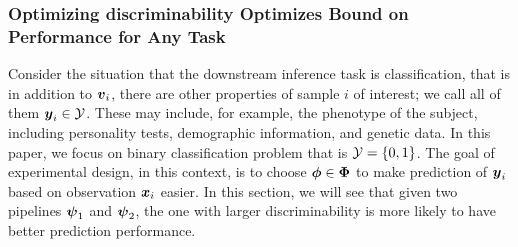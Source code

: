 \documentclass{article}
\begin{document}
\subsubsection{Optimizing discriminability Optimizes Bound on Performance for Any Task}

Consider the situation that the downstream inference task is classification, that is in addition to $\boldsymbol{v}_i$, there are other properties of sample $i$ of interest; we call all of them $\boldsymbol{y}_i \in \mathcal{Y}$.  These may include, for example, the phenotype of the subject, including personality tests, demographic information, and genetic data. In this paper, we focus on binary classification problem that is $\mathcal{Y}=\{0,1\}$. The goal of experimental design, in this context, is to choose $\boldsymbol{\phi} \in \boldsymbol{\Phi}$ to make prediction of $\boldsymbol{y}_i$ based on observation $\boldsymbol{x}_i$ easier. In this section, we will see that given two pipelines $\boldsymbol{\psi}_1$ and $\boldsymbol{\psi}_2$, the one with larger discriminability is more likely to have better prediction performance.  
\end{document}
